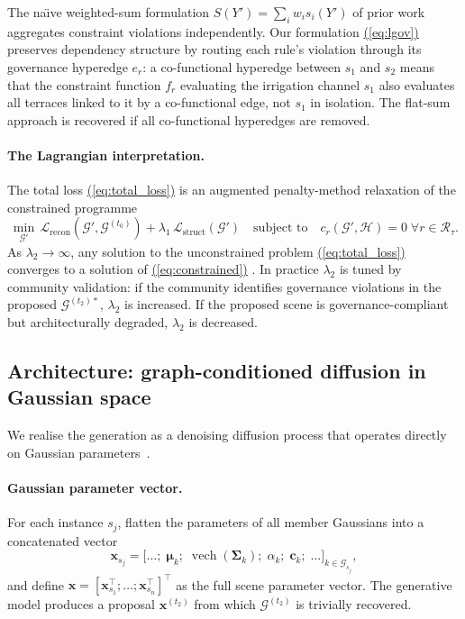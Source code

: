 \documentclass[11pt,a4paper]{article}
\renewcommand{\eqref}[1]{%
    \hyperref[#1]{\textcolor{eqred}{(\ref*{#1})}}%
}
\theoremstyle{plain}
\theoremstyle{definition}
\theoremstyle{remark}
\newcommand{\vech}{\operatorname{vech}}
\newcommand{\GS}{\mathcal{G}}
\newcommand{\HG}{\mathcal{H}}
\newcommand{\Rul}{\mathcal{R}}
\newcommand{\Lrec}{\mathcal{L}_{\mathrm{recon}}}
\newcommand{\Lstruct}{\mathcal{L}_{\mathrm{struct}}}
\begin{document}
\begin{insightbox}
The na\"{\i}ve weighted-sum formulation $S(Y') = \sum_i w_i s_i(Y')$
of prior work aggregates constraint violations independently. Our
formulation \eqref{eq:lgov} preserves dependency structure by routing
each rule's violation through its governance hyperedge $e_r$: a
co-functional hyperedge between $s_1$ and $s_2$ means that the
constraint function $f_r$ evaluating the irrigation channel $s_1$ also
evaluates all terraces linked to it by a co-functional edge, not $s_1$
in isolation. The flat-sum approach is recovered if all co-functional
hyperedges are removed.
\end{insightbox}

\paragraph{The Lagrangian interpretation.}
The total loss \eqref{eq:total_loss} is an augmented penalty-method
relaxation of the constrained programme
\begin{equation}
  \min_{\GS'}\, \Lrec(\GS', \GS^{(t_0)})
  + \lambda_1\,\Lstruct(\GS')
  \quad \text{subject to} \quad
  c_r(\GS', \HG) = 0 \;\forall r \in \Rul_\tau.
  \label{eq:constrained}
\end{equation}
As $\lambda_2 \to \infty$, any solution to the unconstrained
problem \eqref{eq:total_loss} converges to a solution of
\eqref{eq:constrained}. In practice $\lambda_2$ is tuned by
community validation: if the community identifies governance
violations in the proposed $\GS^{(t_2)*}$, $\lambda_2$ is
increased. If the proposed scene is governance-compliant but
architecturally degraded, $\lambda_2$ is decreased.

\subsection{Architecture: graph-conditioned diffusion in Gaussian space}
\label{sec:layer4_arch}

We realise the generation as a denoising diffusion process that
operates directly on Gaussian parameters~\cite{ho2020ddpm, song2021score}.

\paragraph{Gaussian parameter vector.}
For each instance $s_j$, flatten the parameters of all member Gaussians
into a concatenated vector
\[
  \mathbf{x}_{s_j} = \bigl[\ldots;\;
    {\boldsymbol\mu}_k;\; \vech({\boldsymbol\Sigma}_k);\;
    \alpha_k;\; \mathbf{c}_k;\; \ldots\bigr]_{k \in \GS_{s_j}},
\]
and define $\mathbf{x} = [\mathbf{x}_{s_1}^\top; \ldots;
\mathbf{x}_{s_n}^\top]^\top$ as the full scene parameter vector.
The generative model produces a proposal $\mathbf{x}^{(t_2)}$
from which $\GS^{(t_2)}$ is trivially recovered.
\end{document}
